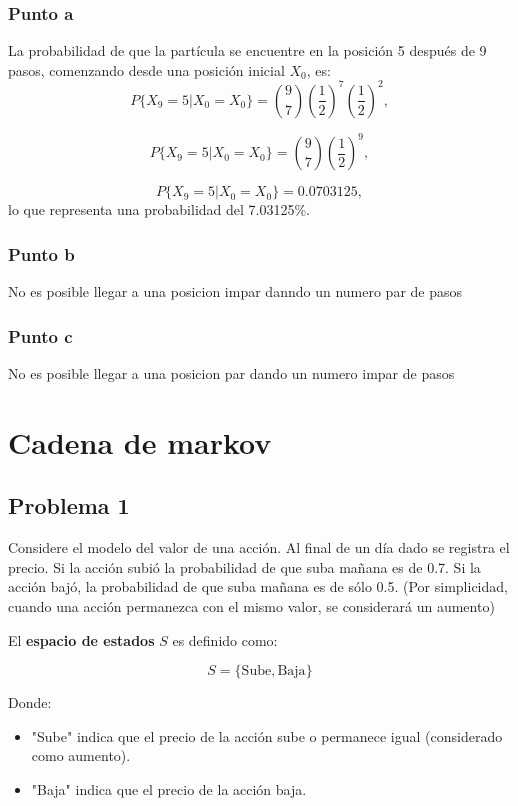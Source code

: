 \documentclass{article}
\begin{document}
\subsubsection*{Punto a}


La probabilidad de que la partícula se encuentre en la posición 5 después de 9 pasos, comenzando desde una posición inicial \(X_0\), es:
\[
    P\{X_9 = 5 | X_0 = X_0\} = \binom{9}{7} \left(\frac{1}{2}\right)^{7} \left(\frac{1}{2}\right)^{2},
\]

\[
    P\{X_9 = 5 | X_0 = X_0\} = \binom{9}{7} \left(\frac{1}{2}\right)^{9},
\]

\[
    P\{X_9 = 5 | X_0 = X_0\} = 0.0703125,
\]
lo que representa una probabilidad del 7.03125\%.

\subsubsection*{Punto b}

No es posible llegar a una posicion impar danndo un numero par de pasos

\subsubsection*{Punto c}

No es posible llegar a una posicion par dando un numero impar de pasos

\section{Cadena de markov}

\subsection{Problema 1}

Considere el modelo del valor de una acción. Al final de un día dado se registra el precio. Si la acción subió la probabilidad de que suba mañana es de 0.7. Si la acción bajó, la probabilidad de que suba mañana es de sólo 0.5. (Por simplicidad, cuando una acción permanezca con el mismo valor, se considerará un aumento)

El \textbf{espacio de estados} \( S \) es definido como:

\[ S = \{ \text{Sube}, \text{Baja} \} \]

Donde:
\begin{itemize}
    \item "Sube" indica que el precio de la acción sube o permanece igual (considerado como aumento).
    \item "Baja" indica que el precio de la acción baja.
\end{itemize}
\end{document}
